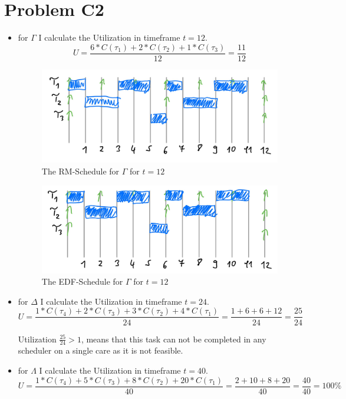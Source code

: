 \documentclass[12pt]{article}
\begin{document}
\section*{Problem C2}
\begin{itemize}
	\item
	  for $\Gamma$ I calculate the Utilization in timeframe $t=12$.
		$$ U = \frac{6 * C(\tau_1) + 2 * C(\tau_2) + 1 * C(\tau_3)}{12} = \frac{11}{12}$$
		\begin{figure}[h]
			\centering
			\includegraphics[scale = 0.2]{figures/c2_1}
			\caption{The RM-Schedule for $\Gamma$ for $t=12$}
		\end{figure}

		\begin{figure}[h]
			\centering
			\includegraphics[scale = 0.2]{figures/c2_2}
			\caption{The EDF-Schedule for $\Gamma$ for $t=12$}
		\end{figure}
  \item
    for $\Delta$ I calculate the Utilization in timeframe $t=24$.
		$$U = \frac{1 * C(\tau_4) + 2 * C(\tau_3) + 3 * C(\tau_2) + 4 * C(\tau_1)}{24} = \frac{1 + 6 + 6 + 12}{24} = \frac{25}{24}$$

		Utilization $\frac{25}{24} > 1$, means that this task can not be completed in any scheduler on a single care as it is not feasible.
\newpage
	\item
		for $\Lambda$ I calculate the Utilization in timeframe $t=40$.
		$$U = \frac{1 * C(\tau_4) + 5 * C(\tau_3) + 8 * C(\tau_2) + 20 * C(\tau_1)}{40} = \frac{2 + 10 + 8 + 20}{40} = \frac{40}{40} = 100 \%$$


\end{itemize}
\end{document}
